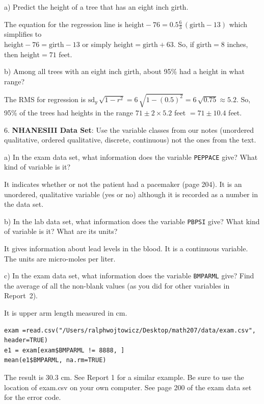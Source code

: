 \documentclass[10pt]{article}
\begin{document}
\hspace{10pt} a) Predict the height of a tree that has an eight inch girth. 

{\color{blue}The equation
for the regression line is $\mbox{height} - 76= \mbox{0.5}\frac{6}{3}\,(\mbox{girth} - 13)$ which 
simplifies to\\ $\mbox{height} - 76= \mbox{girth} - 13$ or simply $\mbox{height}=\mbox{girth} + 63$.
So, if $\mbox{girth}=8$ inches, then $\mbox{height}=71$ feet.}
\medskip

\hspace{10pt} b) Among all trees with an eight inch girth, about 95\% had a height in what range?

{\color{blue}The RMS for regression is $\mbox{sd}_y\,\sqrt{1-r^2}=6\,\sqrt{1-(0.5)^2}=6\,\sqrt{0.75}\approx 5.2$.
  So, 95\% of the trees had heights in the range $71\pm 2\times 5.2$ feet
  $=71\pm 10.4$ feet.}


6. \textbf{NHANESIII Data Set}: Use the variable classes from our notes (unordered qualitative, 
 ordered qualitative, discrete, continuous) not the ones from the text.

\hspace{10pt} a) In the exam data set, what information does the variable \texttt{PEPPACE} give?
What kind of variable is it?

{\color{blue} It indicates whether or not the patient had a pacemaker (page 204).  It is an unordered, qualitative 
variable (yes or no) although it is recorded as a number in the data set.}
\smallskip


\hspace{10pt} b) In the lab data set, what information does the variable \texttt{PBPSI} give?
What kind of variable is it?  What are its units?

{\color{blue} It gives information about lead levels in the blood. It is a continuous variable.
The units are micro-moles per liter.}
\medskip

\hspace{10pt} c) In the exam data set, what information does the variable \texttt{BMPARML} give?
Find the average of all the non-blank values (as you did for other variables in Report~2).

{\color{blue}It is upper arm length measured in cm.
\begin{verbatim}
exam =read.csv("/Users/ralphwojtowicz/Desktop/math207/data/exam.csv", header=TRUE)
e1 = exam[exam$BMPARML != 8888, ]
mean(e1$BMPARML, na.rm=TRUE)
\end{verbatim}
The result is 30.3 cm.  See Report 1 for a similar example. Be sure to use the location of
exam.csv on your own computer.  See page 200 of the exam data set
for the error code.}
\end{document}
